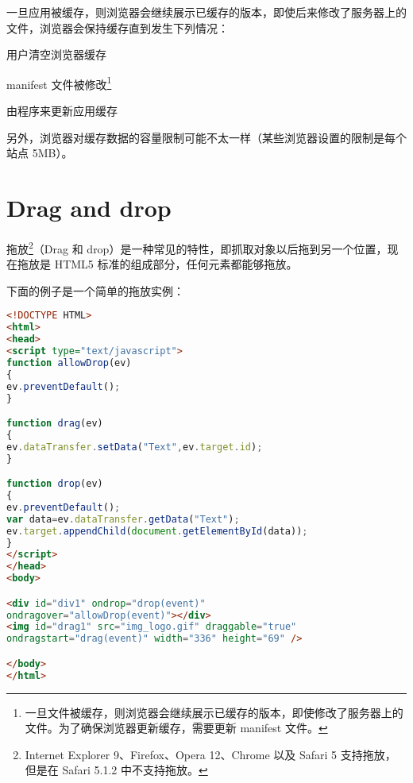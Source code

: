 一旦应用被缓存，则浏览器会继续展示已缓存的版本，即使后来修改了服务器上的文件，浏览器会保持缓存直到发生下列情况：

\begin{compactitem}
\item 用户清空浏览器缓存
\item manifest 文件被修改\footnote{一旦文件被缓存，则浏览器会继续展示已缓存的版本，即使修改了服务器上的文件。为了确保浏览器更新缓存，需要更新 manifest 文件。}
\item 由程序来更新应用缓存
\end{compactitem}

另外，浏览器对缓存数据的容量限制可能不太一样（某些浏览器设置的限制是每个站点 5MB）。



\section{Drag and drop}




拖放\footnote{Internet Explorer 9、Firefox、Opera 12、Chrome 以及 Safari 5 支持拖放，但是在 Safari 5.1.2 中不支持拖放。}（Drag 和 drop）是一种常见的特性，即抓取对象以后拖到另一个位置，现在拖放是 HTML5 标准的组成部分，任何元素都能够拖放。

下面的例子是一个简单的拖放实例：


\begin{lstlisting}[language=HTML]
<!DOCTYPE HTML>
<html>
<head>
<script type="text/javascript">
function allowDrop(ev)
{
ev.preventDefault();
}

function drag(ev)
{
ev.dataTransfer.setData("Text",ev.target.id);
}

function drop(ev)
{
ev.preventDefault();
var data=ev.dataTransfer.getData("Text");
ev.target.appendChild(document.getElementById(data));
}
</script>
</head>
<body>

<div id="div1" ondrop="drop(event)"
ondragover="allowDrop(event)"></div>
<img id="drag1" src="img_logo.gif" draggable="true"
ondragstart="drag(event)" width="336" height="69" />

</body>
</html>
\end{lstlisting}

